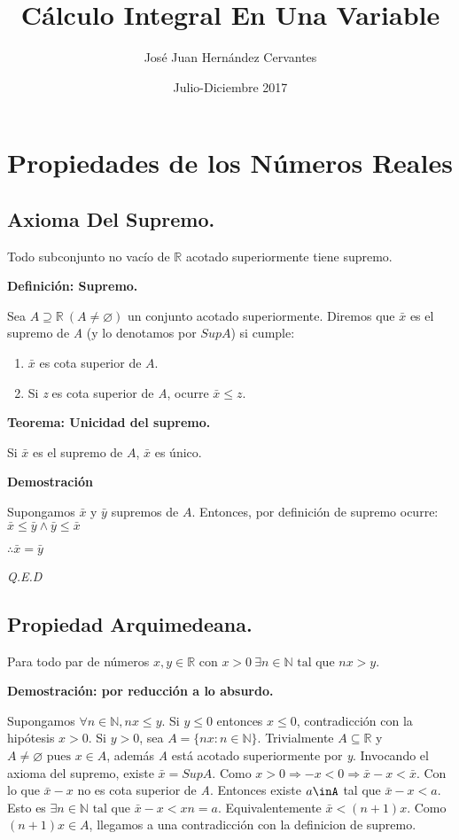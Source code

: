 \documentclass{book}
\title{Cálculo Integral En Una Variable}
\author{José Juan Hernández Cervantes}
\date{Julio-Diciembre 2017}
\begin{document}
\maketitle
\chapter{Propiedades de los Números Reales}
\section{Axioma Del Supremo.}
Todo subconjunto no vacío de $\mathbb{R}$ acotado superiormente tiene supremo.

\textbf{Definición: Supremo.}

Sea $A \supseteq \mathbb{R} \ (A \neq \varnothing)$ un conjunto acotado superiormente.
Diremos que $\bar{x}$ es el supremo de \textit{A} (y lo denotamos por $SupA$) si cumple:
\begin{enumerate}[1.]
\item $\bar{x}$  es cota superior de $A$.
\item Si \textit{z} es cota superior de \textit{A}, ocurre $\bar{x}\le z$.
\end{enumerate}
\textbf{Teorema: Unicidad del supremo.}

Si $\bar{x}$ es el supremo de $A$, $\bar{x}$ es único.

\textbf{Demostración}

Supongamos $\bar{x}$ y $\bar{y}$ supremos de $A$. Entonces, por definición de supremo ocurre:
$\bar{x}\le\bar{y}\land\bar{y}\le\bar{x}$

$\therefore \bar{x}=\bar{y}$

\textit{Q.E.D}

\section{Propiedad Arquimedeana.}

Para todo par de números $x,y\in \mathbb{R}\mbox{ con }x> 0 \ \exists n\in\mathbb{N}\mbox{ tal que }nx> y$.

\textbf{Demostración: por reducción a lo absurdo.}

Supongamos $\forall{n}\in\mathbb{N},nx\le{y}$.
Si $y\le{0}$ entonces $x\le{0}$, contradicción con la hipótesis $x>0$.
Si $y>0$, sea $A=\lbrace nx:n\in{\mathbb{N}}\rbrace$.
Trivialmente $A\subseteq{\mathbb{R}}$ y $ A\neq \varnothing\mbox{ pues }x\in A$, además \textit{A} está acotado superiormente por \textit{y}.
Invocando el axioma del supremo, existe $\bar{x}=SupA$.
Como $x>0 \Rightarrow -x<0\Rightarrow \bar{x}-x<\bar{x}$.
Con lo que $\bar{x}-x$ no es cota superior de \textit{A}.
Entonces existe $a\inA$ tal que $\bar{x}-x<a$.
Esto es $\exists{n}\in{\mathbb{N}}\mbox{ tal que }\bar{x}-x<xn=a$. Equivalentemente $\bar{x}<(n+1)x$.
Como $(n+1)x\in{A}$, llegamos a una contradicción con la definicion de supremo.
\end{document}
